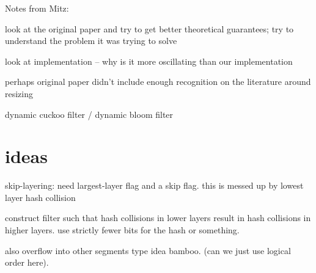 \documentclass[11pt,letterpaper]{article}
\theoremstyle{plain}
\theoremstyle{plain}
\theoremstyle{plain}
\theoremstyle{plain}
\theoremstyle{plain}
\theoremstyle{plain}
\theoremstyle{plain}
\theoremstyle{plain}
\begin{document}
Notes from Mitz:

look at the original paper and try to get better theoretical guarantees; try to understand the problem it was trying to solve

look at implementation -- why is it more oscillating than our implementation

perhaps original paper didn't include enough recognition on the literature around resizing

dynamic cuckoo filter / dynamic bloom filter

\section{ideas}

skip-layering: need largest-layer flag and a skip flag. this is messed up by lowest layer hash collision

construct filter such that hash collisions in lower layers result in hash collisions in higher layers. use strictly fewer bits for the hash or something.

also overflow into other segments type idea bamboo. (can we just use logical order here).
\end{document}
